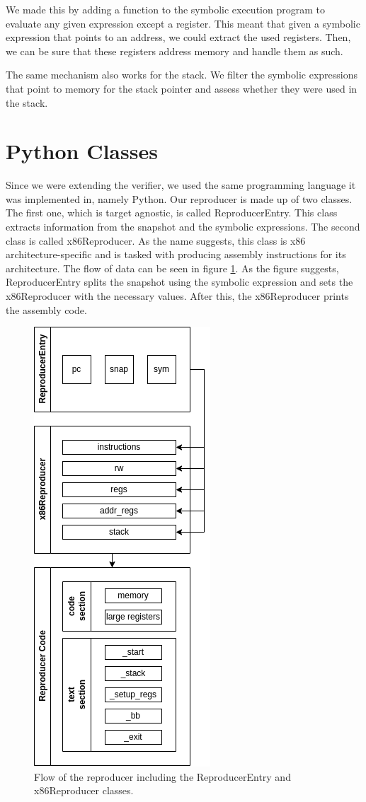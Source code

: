 We made this by adding a function to the symbolic execution program to evaluate any given expression except a register.
This meant that given a symbolic expression that points to an address, we could extract the used registers.
Then, we can be sure that these registers address memory and handle them as such.

The same mechanism also works for the stack.
We filter the symbolic expressions that point to memory for the stack pointer and assess whether they were used in the stack.

\section{Python Classes}
Since we were extending the verifier, we used the same programming language it was implemented in, namely Python.
Our reproducer is made up of two classes.
The first one, which is target agnostic, is called ReproducerEntry.
This class extracts information from the snapshot and the symbolic expressions.
The second class is called x86Reproducer.
As the name suggests, this class is x86 architecture-specific and is tasked with producing assembly instructions for its architecture.
The flow of data can be seen in figure \ref{fig:rep_ent}.
As the figure suggests, ReproducerEntry splits the snapshot using the symbolic expression and sets the x86Reproducer with the necessary values.
After this, the x86Reproducer prints the assembly code.

\begin{figure}[ht]
    \centering
    \includegraphics[width=0.5\linewidth]{figures/rep_ent}
    \caption{Flow of the reproducer including the ReproducerEntry and x86Reproducer classes.}
    \label{fig:rep_ent}
\end{figure}

